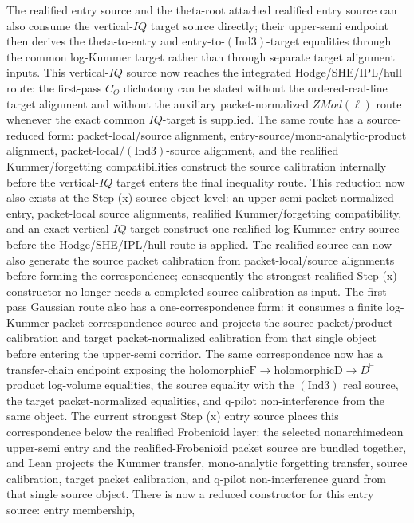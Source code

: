 \documentclass[11pt]{article}
\newcommand{\Lean}{Lean}
\newcommand{\Ind}{\ensuremath{\mathrm{Ind}}}
\theoremstyle{plain}
\theoremstyle{definition}
\theoremstyle{remark}
\begin{document}
The realified entry source and the theta-root attached realified entry source
can also consume the vertical-\(IQ\) target source directly; their upper-semi
endpoint then derives the theta-to-entry and entry-to-\((\Ind3)\)-target
equalities through the common log-Kummer target rather than through separate
target alignment inputs.
This vertical-\(IQ\) source now reaches the integrated Hodge/SHE/IPL/hull
route: the first-pass \(C_\Theta\) dichotomy can be stated without the
ordered-real-line target alignment and without the auxiliary packet-normalized
\(ZMod(\ell)\) route whenever the exact common \(IQ\)-target is supplied.
The same route has a source-reduced form: packet-local/source alignment,
entry-source/mono-analytic-product alignment, packet-local/\((\Ind3)\)-source
alignment, and the realified Kummer/forgetting compatibilities construct the
source calibration internally before the vertical-\(IQ\) target enters the
final inequality route.
This reduction now also exists at the Step (x) source-object level: an
upper-semi packet-normalized entry, packet-local source alignments, realified
Kummer/forgetting compatibility, and an exact vertical-\(IQ\) target construct
one realified log-Kummer entry source before the Hodge/SHE/IPL/hull route is
applied.
The realified source can now also generate the source packet calibration from
packet-local/source alignments before forming the correspondence; consequently
the strongest realified Step (x) constructor no longer needs a completed source
calibration as input.
The first-pass Gaussian route also has a one-correspondence form: it consumes
a finite log-Kummer packet-correspondence source and projects the source
packet/product calibration and target packet-normalized calibration from that
single object before entering the upper-semi corridor.
The same correspondence now has a transfer-chain endpoint exposing the
\(\mathrm{holomorphicF}\to\mathrm{holomorphicD}\to D^\vdash\) product
log-volume equalities, the source equality with the \((\Ind3)\) real source,
the target packet-normalized equalities, and q-pilot non-interference from the
same object.
The current strongest Step (x) entry source places this correspondence below
the realified Frobenioid layer: the selected nonarchimedean upper-semi entry
and the realified-Frobenioid packet source are bundled together, and \Lean{}
projects the Kummer transfer, mono-analytic forgetting transfer, source
calibration, target packet calibration, and q-pilot non-interference guard from
that single source object.
There is now a reduced constructor for this entry source: entry membership,
\end{document}
